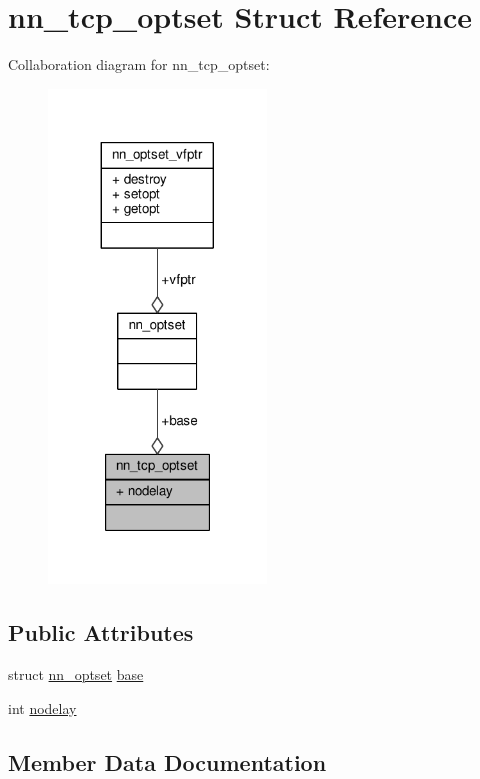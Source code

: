 \hypertarget{structnn__tcp__optset}{}\section{nn\+\_\+tcp\+\_\+optset Struct Reference}
\label{structnn__tcp__optset}


Collaboration diagram for nn\+\_\+tcp\+\_\+optset\+:\nopagebreak
\begin{figure}[H]
\begin{center}
\leavevmode
\includegraphics[width=164pt]{structnn__tcp__optset__coll__graph}
\end{center}
\end{figure}
\subsection*{Public Attributes}
\begin{DoxyCompactItemize}
\item 
struct \hyperlink{structnn__optset}{nn\+\_\+optset} \hyperlink{structnn__tcp__optset_adc310c531e0e75b90710658ac2db646d}{base}
\item 
int \hyperlink{structnn__tcp__optset_aba86c4b054d9bf1aa0d17d97d6a9c764}{nodelay}
\end{DoxyCompactItemize}


\subsection{Member Data Documentation}
